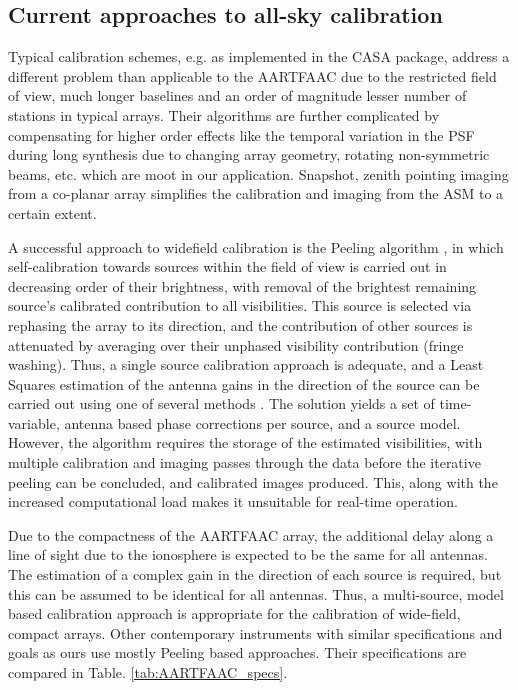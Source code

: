 \documentclass{aa}
\begin{document}
\subsection{Current approaches to all-sky calibration}
Typical calibration schemes, e.g. as  implemented in the CASA package, address a
different problem than applicable to the AARTFAAC due to the restricted field of
view, much longer baselines and an  order of magnitude lesser number of stations
in typical arrays. Their algorithms  are further complicated by compensating for
higher  order  effects  like the  temporal  variation  in  the PSF  during  long
synthesis  due  to  changing   array  geometry,  rotating  non-symmetric  beams,
etc. which are moot in our application. Snapshot, zenith pointing imaging from a
co-planar array simplifies the calibration and imaging from the ASM to a certain
extent.

A  successful  approach  to  widefield  calibration  is  the  Peeling  algorithm
\citep{noordam2004peel,vdTol2007selfcallofar}, in which self-calibration towards
sources within  the field of  view is carried  out in decreasing order  of their
brightness,  with  removal  of   the  brightest  remaining  source's  calibrated
contribution  to all  visibilities. This  source is  selected via  rephasing the
array to its  direction, and the contribution of other  sources is attenuated by
averaging over their unphased  visibility contribution (fringe washing). Thus, a
single source calibration  approach is adequate, and a  Least Squares estimation
of the antenna gains in the direction of the source can be carried out using one
of  several  methods \citep{boonstra2003gain}.  The  solution  yields  a set  of
time-variable,  antenna  based  phase  corrections  per  source,  and  a  source
model.   However,  the  algorithm   requires  the   storage  of   the  estimated
visibilities,  with multiple  calibration and  imaging passes  through  the data
before  the   iterative  peeling  can   be  concluded,  and   calibrated  images
produced. This, along with the  increased computational load makes it unsuitable
for real-time operation.

Due to the compactness of the  AARTFAAC array, the additional delay along a line
of sight due to the ionosphere is  expected to be the same for all antennas. The
estimation of  a complex gain in the  direction of each source  is required, but
this can  be assumed  to be  identical for all  antennas. Thus,  a multi-source,
model  based  calibration  approach   is  appropriate  for  the  calibration  of
wide-field,  compact  arrays.    Other  contemporary  instruments  with  similar
specifications and  goals as  ours use mostly  Peeling based  approaches.  Their
specifications are compared in Table.  \ref{tab:AARTFAAC_specs}.
\end{document}
